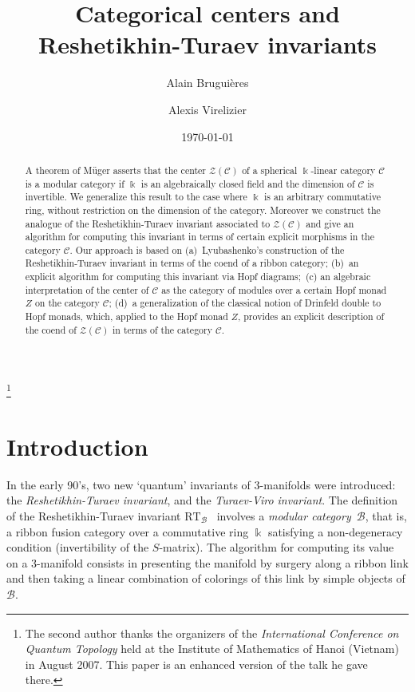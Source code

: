\documentclass[a4paper]{amsart}
\theoremstyle{definition}
\newcommand{\cc}{\mathcal{C}}
\newcommand{\bb}{\mathcal{B}}
\newcommand{\zz}{\mathcal{Z}}
\newcommand{\kk}{\Bbbk}
\newcommand{\kt}{$\Bbbk$\nobreakdash-\hspace{0pt}}
\begin{document}
\title{Categorical centers and Reshetikhin-Turaev invariants}
\author[A. Brugui\`eres]{Alain Brugui\`eres}
\author[A. Virelizier]{Alexis Virelizier}
\thanks{The second author thanks the organizers of the \emph{International Conference
on Quantum Topology} held at the Institute of Mathematics of Hanoi (Vietnam) in August 2007. This paper is an enhanced
version of the talk he gave there.} 
\date{\today}

\begin{abstract}
A theorem of M\"uger asserts that the center $\zz(\cc)$ of a spherical \kt linear category $\cc$ is a modular category if
$\kk$ is an algebraically closed field and the dimension of $\cc$ is invertible. We generalize this result to the case where
$\kk$ is an arbitrary commutative ring, without restriction on the dimension of the category. Moreover we construct the
analogue of the Reshetikhin-Turaev invariant associated to $\zz(\cc)$ and give an algorithm for computing this invariant in
terms of certain explicit morphisms in the category $\cc$. Our approach is based on (a)~Lyubashenko's construction of the
Reshetikhin-Turaev invariant in terms of the coend of a ribbon category; (b)~an explicit algorithm for computing this
invariant via Hopf diagrams;~(c) an algebraic interpretation of the center of $\cc$ as the category of modules over a
certain Hopf monad $Z$ on the category $\cc$; (d)~a generalization of the classical notion of Drinfeld double to Hopf
monads, which, applied to the Hopf monad $Z$, provides an explicit description of the coend of $\zz(\cc)$ in terms of the
category $\cc$.
\end{abstract}
\maketitle

\setcounter{tocdepth}{1} \tableofcontents

\section*{Introduction}
In the early 90's, two new `quantum' invariants of $3$-manifolds were introduced: the \emph{Reshetikhin-Turaev invariant},
and the \emph{Turaev-Viro invariant}. The definition of the Reshetikhin-Turaev invariant $\mathrm{RT}_\bb$~\cite{RT2,Tur2}
involves a \emph{modular category}~$\bb$, that is, a ribbon fusion category over a commutative ring $\kk$ satisfying a
non-degeneracy condition (invertibility of the $S$-matrix). The algorithm for computing its value on a $3$-manifold consists
in presenting the manifold by surgery along a ribbon link and then taking a linear combination of colorings of this link by
simple objects of $\bb$.
\end{document}
